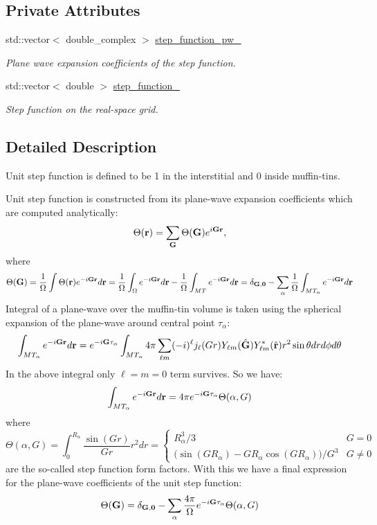 \subsection*{Private Attributes}
\begin{DoxyCompactItemize}
\item 
std\+::vector$<$ double\+\_\+complex $>$ \hyperlink{classsirius_1_1_step__function_a3a57b383d5fb66fefdd153ac94064c9d}{step\+\_\+function\+\_\+pw\+\_\+}
\begin{DoxyCompactList}\small\item\em Plane wave expansion coefficients of the step function. \end{DoxyCompactList}\item 
std\+::vector$<$ double $>$ \hyperlink{classsirius_1_1_step__function_a811fd3e1fe15e4e66820cbee8dba05a8}{step\+\_\+function\+\_\+}
\begin{DoxyCompactList}\small\item\em Step function on the real-\/space grid. \end{DoxyCompactList}\end{DoxyCompactItemize}


\subsection{Detailed Description}
Unit step function is defined to be 1 in the interstitial and 0 inside muffin-\/tins. 

Unit step function is constructed from it\textquotesingle{}s plane-\/wave expansion coefficients which are computed analytically\+: \[ \Theta({\bf r}) = \sum_{\bf G} \Theta({\bf G}) e^{i{\bf Gr}}, \] where \[ \Theta({\bf G}) = \frac{1}{\Omega} \int \Theta({\bf r}) e^{-i{\bf Gr}} d{\bf r} = \frac{1}{\Omega} \int_{\Omega} e^{-i{\bf Gr}} d{\bf r} - \frac{1}{\Omega} \int_{MT} e^{-i{\bf Gr}} d{\bf r} = \delta_{\bf G, 0} - \sum_{\alpha} \frac{1}{\Omega} \int_{MT_{\alpha}} e^{-i{\bf Gr}} d{\bf r} \] Integral of a plane-\/wave over the muffin-\/tin volume is taken using the spherical expansion of the plane-\/wave around central point $ \tau_{\alpha} $\+: \[ \int_{MT_{\alpha}} e^{-i{\bf Gr}} d{\bf r} = e^{-i{\bf G\tau_{\alpha}}} \int_{MT_{\alpha}} 4\pi \sum_{\ell m} (-i)^{\ell} j_{\ell}(Gr) Y_{\ell m}(\hat {\bf G}) Y_{\ell m}^{*}(\hat {\bf r}) r^2 \sin \theta dr d\phi d\theta \] In the above integral only $ \ell=m=0 $ term survives. So we have\+: \[ \int_{MT_{\alpha}} e^{-i{\bf Gr}} d{\bf r} = 4\pi e^{-i{\bf G\tau_{\alpha}}} \Theta(\alpha, G) \] where \[ \Theta(\alpha, G) = \int_{0}^{R_{\alpha}} \frac{\sin(Gr)}{Gr} r^2 dr = \left\{ \begin{array}{ll} \displaystyle R_{\alpha}^3 / 3 & G=0 \\ \Big( \sin(GR_{\alpha}) - GR_{\alpha}\cos(GR_{\alpha}) \Big) / G^3 & G \ne 0 \end{array} \right. \] are the so-\/called step function form factors. With this we have a final expression for the plane-\/wave coefficients of the unit step function\+: \[ \Theta({\bf G}) = \delta_{\bf G, 0} - \sum_{\alpha} \frac{4\pi}{\Omega} e^{-i{\bf G\tau_{\alpha}}} \Theta(\alpha, G) \] 

